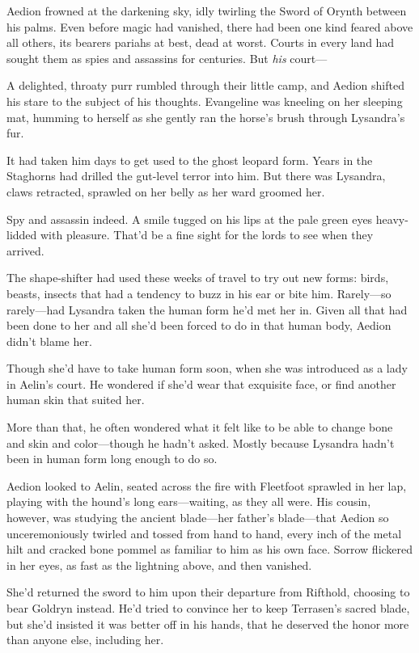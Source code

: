 Aedion frowned at the darkening sky, idly twirling the Sword of Orynth between his palms. Even before magic had vanished, there had been one kind feared above all others, its bearers pariahs at best, dead at worst. Courts in every land had sought them as spies and assassins for centuries. But \emph{his} court---

A delighted, throaty purr rumbled through their little camp, and Aedion shifted his stare to the subject of his thoughts. Evangeline was kneeling on her sleeping mat, humming to herself as she gently ran the horse's brush through Lysandra's fur.

It had taken him days to get used to the ghost leopard form. Years in the Staghorns had drilled the gut-level terror into him. But there was Lysandra, claws retracted, sprawled on her belly as her ward groomed her.

Spy and assassin indeed. A smile tugged on his lips at the pale green eyes heavy-lidded with pleasure. That'd be a fine sight for the lords to see when they arrived.

The shape-shifter had used these weeks of travel to try out new forms:
birds, beasts, insects that had a tendency to buzz in his ear or bite him. Rarely---so rarely---had Lysandra taken the human form he'd met her in. Given all that had been done to her and all she'd been forced to do in that human body, Aedion didn't blame her.

Though she'd have to take human form soon, when she was introduced as a lady in Aelin's court. He wondered if she'd wear that exquisite face, or find another human skin that suited her.

More than that, he often wondered what it felt like to be able to change bone and skin and color---though he hadn't asked. Mostly because Lysandra hadn't been in human form long enough to do so.

Aedion looked to Aelin, seated across the fire with Fleetfoot sprawled in her lap, playing with the hound's long ears---waiting, as they all were. His cousin, however, was studying the ancient blade---her father's blade---that Aedion so unceremoniously twirled and tossed from hand to hand, every inch of the metal hilt and cracked bone pommel as familiar to him as his own face. Sorrow flickered in her eyes, as fast as the lightning above, and then vanished.

She'd returned the sword to him upon their departure from Rifthold, choosing to bear Goldryn instead. He'd tried to convince her to keep Terrasen's sacred blade, but she'd insisted it was better off in his hands, that he deserved the honor more than anyone else, including her.


